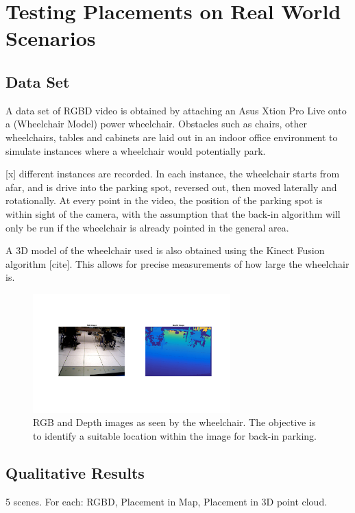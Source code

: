 \section{Testing Placements on Real World Scenarios}

\subsection{Data Set}
\label{sec:rgbddataset}
A data set of RGBD video is obtained by attaching an Asus Xtion Pro Live onto a
(Wheelchair Model) power wheelchair. Obstacles such as chairs, other
wheelchairs, tables and cabinets are laid out in an indoor office environment to
simulate instances where a wheelchair would potentially park.

[x] different instances are recorded. In each instance, the wheelchair starts
from afar, and is drive into the parking spot, reversed out, then moved
laterally and rotationally. At every point in the video, the position of the
parking spot is within sight of the camera, with the assumption that the back-in
algorithm will only be run if the wheelchair is already pointed in the general
area.

A 3D model of the wheelchair used is also obtained using the Kinect Fusion
algorithm [cite]. This allows for precise measurements of how large the
wheelchair is.

\begin{figure}
\centering
\includegraphics[width=3in]{figures/rgbdwheelchair.png}
\caption{RGB and Depth images as seen by the wheelchair. The objective is to
identify a suitable location within the image for back-in parking.}
\label{fig:rgbdwheelchair}
\end{figure}

\subsection{Qualitative Results}
5 scenes. For each: RGBD, Placement in Map, Placement in 3D point cloud.

